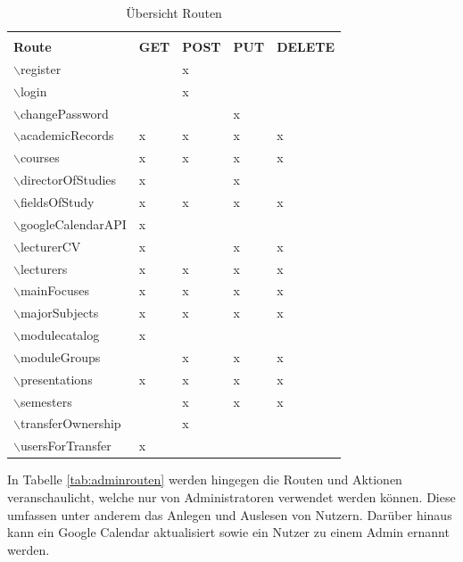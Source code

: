 \begin{table}[h]
	\centering
	\renewcommand*{\arraystretch}{1.25}
	\begin{tabular}{|l|P{2cm}|P{2cm}|P{2cm}|P{2cm}|}
		\hline &&\\[-0.6em]
		\textbf{Route} & \textbf{GET} & \textbf{POST} & \textbf{PUT} & \textbf{DELETE} \\ \hline
		$\backslash$register & & x & & \\ \hline
		$\backslash$login & & x & & \\ \hline
		$\backslash$changePassword & & & x & \\ \hline
		$\backslash$academicRecords & x & x & x & x \\ \hline
		$\backslash$courses & x & x & x & x \\ \hline
		$\backslash$directorOfStudies & x & & x & \\ \hline
		$\backslash$fieldsOfStudy & x & x & x & x \\ \hline
		$\backslash$googleCalendarAPI & x & & & \\ \hline
		$\backslash$lecturerCV & x & & x & x \\ \hline
		$\backslash$lecturers & x & x & x & x \\ \hline
		$\backslash$mainFocuses & x & x & x & x \\ \hline
		$\backslash$majorSubjects & x & x & x & x \\ \hline
		$\backslash$modulecatalog & x & & & \\ \hline
		$\backslash$moduleGroups & & x & x & x \\ \hline
		$\backslash$presentations & x & x & x & x \\ \hline
		$\backslash$semesters & & x & x & x \\ \hline
		$\backslash$transferOwnership & & x & & \\ \hline
		$\backslash$usersForTransfer & x & & & \\ \hline
	\end{tabular}
	\captionsetup{format=hang}
	\caption{\label{tab:routen}Übersicht Routen \\}
\end{table}

In Tabelle \ref{tab:adminrouten} werden hingegen die Routen und Aktionen veranschaulicht, welche nur von Administratoren verwendet werden können.
Diese umfassen unter anderem das Anlegen und Auslesen von Nutzern.
Darüber hinaus kann ein Google Calendar aktualisiert sowie ein Nutzer zu einem Admin ernannt werden. 

